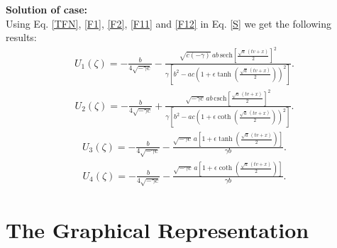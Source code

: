\documentclass[10pt]{NSP1}
\numberwithin{equation}{section}
\begin{document}
\textbf{Solution of case:}\\
Using Eq. \ref{TFN}, \ref{F1}, \ref{F2}, \ref{F11} and \ref{F12} in Eq. \ref{S} we get the following results:
\begin{eqnarray}\label{U1}
U_{1}\left(\zeta \right) =-\frac{b}{4 \sqrt{-\gamma  c}}-\frac{\sqrt{c (-\gamma)}\, a b\, \mathrm{sech} \left[\frac{\sqrt{a}\, \left(t v +x \right)}{2}\right]^{2}}{\gamma  \left[b^{2}-a c \left(1+\epsilon  \tanh  \left(\frac{\sqrt{a}\, \left(t v +x \right)}{2}\right)\right)^{2}\right]}.
\end{eqnarray}
\begin{eqnarray}\label{U2}
U_{2}\left(\zeta \right) =-\frac{b}{4 \sqrt{-\gamma  c}}+\frac{\sqrt{-\gamma  c}\, a b\, \mathrm{csch} \left[\frac{\sqrt{a}\, \left(t v +x \right)}{2}\right]^{2}}{\gamma  \left[b^{2}-a c \left(1+\epsilon  \coth  \left(\frac{\sqrt{a}\, \left(t v +x \right)}{2}\right)\right)^{2}\right]}.
\end{eqnarray}
\begin{eqnarray}\label{U3}
U_{3}\left(\zeta \right) =-\frac{b}{4 \sqrt{-\gamma  c}}-\frac{\sqrt{-\gamma  c}\, a \left[1+\epsilon  \tanh  \left(\frac{\sqrt{a}\, \left(t v +x \right)}{2}\right)\right]}{\gamma  b}.
\end{eqnarray}
\begin{eqnarray}\label{U4}
U_{4}\left(\zeta \right) =
-\frac{b}{4 \sqrt{-\gamma  c}}-\frac{\sqrt{-\gamma  c}\, a \left[1+\epsilon  \coth \left(\frac{\sqrt{a}\, \left(t v +x \right)}{2}\right)\right]}{\gamma  b}.
\end{eqnarray}

\newpage

\section{The Graphical Representation}
\end{document}
